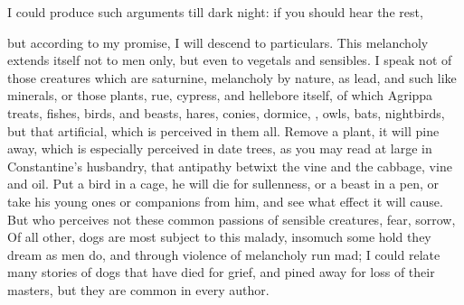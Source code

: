 I could produce such arguments till dark night: if you should hear the rest,


but according to my promise, I will descend to particulars. This melancholy
extends itself not to men only, but even to vegetals and sensibles. I speak not
of those creatures which are saturnine, melancholy by nature, as lead, and such
like minerals, or those plants, rue, cypress, \etc{} and hellebore itself, of
which Agrippa treats, fishes, birds, and beasts, hares,
conies, dormice, \etc{}, owls, bats, nightbirds, but that artificial, which is
perceived in them all. Remove a plant, it will pine away, which is especially
perceived in date trees, as you may read at large in Constantine's husbandry,
that antipathy betwixt the vine and the cabbage, vine and oil. Put a bird in a
cage, he will die for sullenness, or a beast in a pen, or take his young ones
or companions from him, and see what effect it will cause. But who perceives
not these common passions of sensible creatures, fear, sorrow, \etc{} Of all
other, dogs are most subject to this malady, insomuch some hold they dream as
men do, and through violence of melancholy run mad; I could relate many stories
of dogs that have died for grief, and pined away for loss of their masters, but
they are common in every author.

